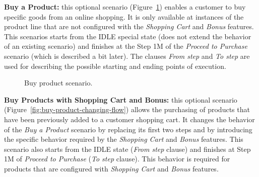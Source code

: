 \documentclass{acm_proc_article-sp}
\begin{document}
{\bf Buy a Product:} this optional scenario (Figure~\ref{fig:buy-product-scenario}) enables a customer to buy specific goods from an online shopping. It is only available at instances of the product line that are not configured with the \emph{Shopping Cart} and \emph{Bonus} features. This scenarios starts from the IDLE special state  (does not extend the behavior of an existing scenario) and finishes at the Step 1M of the \emph{Proceed to Purchase} scenario (which is described a bit later). The clauses \emph{From step} and \emph{To step} are used for describing the possible starting and ending points of execution. 

\begin{figure}[h]
\caption{Buy product scenario.}
\label{fig:buy-product-scenario}
\end{figure}


{\bf Buy Products with Shopping Cart and Bonus:} this optional scenario (Figure~\ref{fig:buy-product-changing-flow}) allows the purchasing of products that have been previously added to a customer shopping cart. It changes the behavior of the \emph{Buy a Product} scenario by replacing its first two steps and by introducing the specific behavior required by the \emph{Shopping Cart} and 
\emph{Bonus} features. This scenario also starts from the IDLE state (\emph{From step} clause) and finishes at Step 1M of \emph{Proceed to Purchase} (\emph{To step} clause). This behavior is required for products that are configured with \emph{Shopping Cart} and \emph{Bonus} features.
\end{document}
